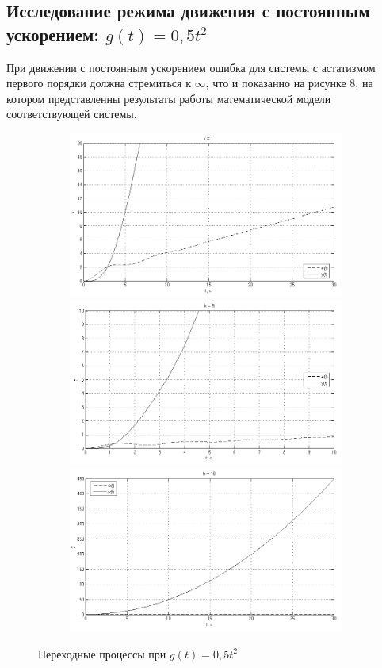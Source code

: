 \documentclass[a4paper, 11pt, russian]{article}
\begin{document}
    \subsection{Исследование режима движения с постоянным ускорением: $g(t) = 0,5t^2$}
    При движении с постоянным ускорением ошибка для системы с астатизмом первого порядки должна стремиться к $\infty$, что и показанно на рисунке 8, на котором представленны результаты работы математической модели соответствующей системы.
    \begin{figure}[ht!]
        \centering
        \begin{subfigure}{0.75\textwidth}
            \includegraphics[width = \textwidth]{aInput1ast1k.png}
            \includegraphics[width = \textwidth]{aInput1ast5k.png}
            \includegraphics[width = \textwidth]{aInput1ast10k.png}
        \end{subfigure}
        \caption{Переходные процессы при $g(t) = 0,5t^2$}
    \end{figure}
    \clearpage
\end{document}
